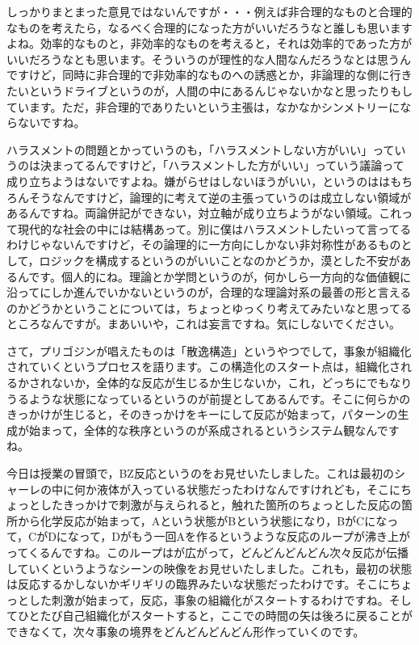 \documentclass{ltjsbook}
\begin{document}
しっかりまとまった意見ではないんですが・・・例えば非合理的なものと合理的なものを考えたら，なるべく合理的になった方がいいだろうなと誰しも思いますよね。効率的なものと，非効率的なものを考えると，それは効率的であった方がいいだろうなとも思います。そういうのが理性的な人間なんだろうなとは思うんですけど，同時に非合理的で非効率的なものへの誘惑とか，非論理的な側に行きたいというドライブというのが，人間の中にあるんじゃないかなと思ったりもしています。ただ，非合理的でありたいという主張は，なかなかシンメトリーにならないですね。

ハラスメントの問題とかっていうのも，「ハラスメントしない方がいい」っていうのは決まってるんですけど，「ハラスメントした方がいい」っていう議論って成り立ちようはないですよね。嫌がらせはしないほうがいい，というのははもちろんそうなんですけど，論理的に考えて逆の主張っていうのは成立しない領域があるんですね。両論併記ができない，対立軸が成り立ちようがない領域。これって現代的な社会の中には結構あって。別に僕はハラスメントしたいって言ってるわけじゃないんですけど，その論理的に一方向にしかない非対称性があるものとして，ロジックを構成するというのがいいことなのかどうか，漠とした不安があるんです。個人的にね。理論とか学問というのが，何かしら一方向的な価値観に沿ってにしか進んでいかないというのが，合理的な理論対系の最善の形と言えるのかどうかということについては，ちょっとゆっくり考えてみたいなと思ってるところなんですが。まあいいや，これは妄言ですね。気にしないでください。


さて，プリゴジンが唱えたものは「散逸構造」というやつでして，事象が組織化されていくというプロセスを語ります。この構造化のスタート点は，組織化されるかされないか，全体的な反応が生じるか生じないか，これ，どっちにでもなりうるような状態になっているというのが前提としてあるんです。そこに何らかのきっかけが生じると，そのきっかけをキーにして反応が始まって，パターンの生成が始まって，全体的な秩序というのが系成されるというシステム観なんですね。

今日は授業の冒頭で，BZ反応というのをお見せいたしました。これは最初のシャーレの中に何か液体が入っている状態だったわけなんですけれども，そこにちょっとしたきっかけで刺激が与えられると，触れた箇所のちょっとした反応の箇所から化学反応が始まって，Aという状態がBという状態になり，BがCになって，CがDになって，Dがもう一回Aを作るというような反応のループが沸き上がってくるんですね。このループはが広がって，どんどんどんどん次々反応が伝播していくというようなシーンの映像をお見せいたしました。これも，最初の状態は反応するかしないかギリギリの臨界みたいな状態だったわけです。そこにちょっとした刺激が始まって，反応，事象の組織化がスタートするわけですね。そしてひとたび自己組織化がスタートすると，ここでの時間の矢は後ろに戻ることができなくて，次々事象の境界をどんどんどんどん形作っていくのです。
\end{document}
